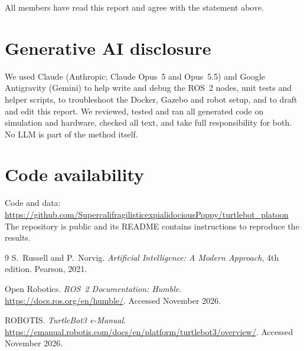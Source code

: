 \documentclass[11pt,a4paper,twocolumn]{article}
\newcommand{\githuburl}{https://github.com/SupercalifragilisticexpialidociousPoppy/turtlebot_platoon}
\begin{document}
\smallskip
\noindent All members have read this report and agree with the statement above.

\section*{Generative AI disclosure}
We used Claude (Anthropic; Claude Opus~5 and Opus~5.5) and Google Antigravity (Gemini) to
help write and debug the ROS~2 nodes, unit tests and helper scripts, to troubleshoot the
Docker, Gazebo and robot setup, and to draft and edit this report. We reviewed, tested and
ran all generated code on simulation and hardware, checked all text, and take full
responsibility for both. No LLM is part of the method itself.

\section*{Code availability}
\noindent Code and data:\\
\url{\githuburl}\\
The repository is public and its README contains instructions to reproduce the results.

\begin{thebibliography}{9}
\small
{}
S.~Russell and P.~Norvig.
\newblock \emph{Artificial Intelligence: A Modern Approach}, 4th edition.
\newblock Pearson, 2021.

Open Robotics.
\newblock \emph{ROS~2 Documentation: Humble}.
\newblock \url{https://docs.ros.org/en/humble/}. Accessed November 2026.

ROBOTIS.
\newblock \emph{TurtleBot3 e-Manual}.
\newblock \url{https://emanual.robotis.com/docs/en/platform/turtlebot3/overview/}.
\newblock Accessed November 2026.
\end{thebibliography}
\end{document}
